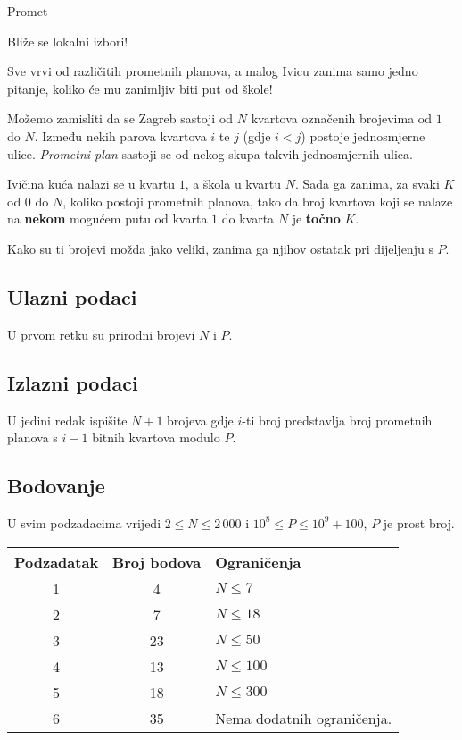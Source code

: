 \begin{statement}[
  problempoints=100,
  timelimit=1 sekunda,
  memorylimit=1024 MiB,
]{Promet}\

Bliže se lokalni izbori!

Sve vrvi od različitih prometnih planova, a malog Ivicu zanima samo jedno pitanje, koliko će mu zanimljiv biti put od škole!

Možemo zamisliti da se Zagreb sastoji od $N$ kvartova označenih brojevima od $1$ do $N$. Između nekih parova kvartova $i$ te $j$ (gdje $i < j$) postoje jednosmjerne ulice. \textit{Prometni plan} sastoji se od nekog skupa takvih jednosmjernih ulica. 

Ivičina kuća nalazi se u kvartu $1$, a škola u kvartu $N$. Sada ga zanima, za svaki $K$ od $0$ do $N$, koliko postoji prometnih planova, tako da broj kvartova koji se nalaze na \textbf{nekom} mogućem putu od kvarta $1$ do kvarta $N$ je \textbf{točno} $K$.

Kako su ti brojevi možda jako veliki, zanima ga njihov ostatak pri dijeljenju s $P$.


\subsection*{Ulazni podaci}

U prvom retku su prirodni brojevi $N$ i $P$.

\subsection*{Izlazni podaci}

U jedini redak ispišite $N + 1$ brojeva gdje $i$-ti broj predstavlja broj prometnih planova s $i - 1$ bitnih kvartova modulo $P$.

\subsection*{Bodovanje}

U svim podzadacima vrijedi $2 \leq N \leq 2\,000$ i $10^8 \leq P \leq 10^9 + 100$, $P$ je prost broj.

{\renewcommand{\arraystretch}{1.4}
  \setlength{\tabcolsep}{6pt}
  \begin{tabular}{ccl}
   Podzadatak & Broj bodova & Ograničenja \\ \midrule
   	1 & 4 & $N \leq 7$ \\
    2 & 7 & $N \leq 18$ \\
    3 & 23 & $N \leq 50$ \\
    4 & 13 & $N \leq 100$ \\
    5 & 18 & $N \leq 300$ \\
    6 & 35 & Nema dodatnih ograničenja. \\
\end{tabular}}


\end{statement}
